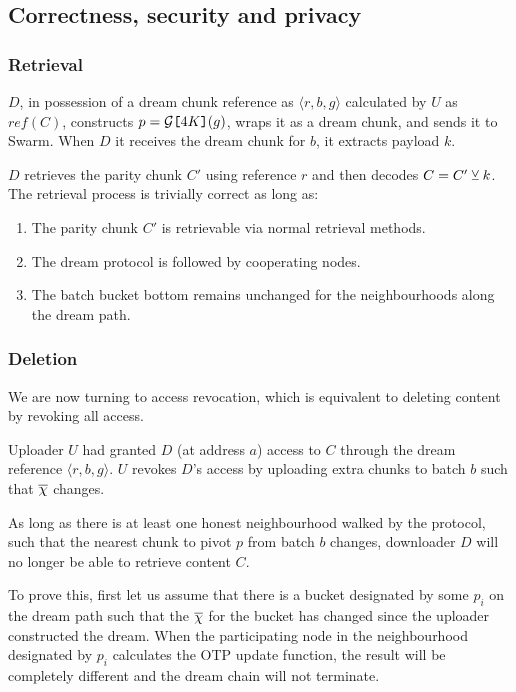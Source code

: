 \subsection{Correctness, security and privacy}

\subsubsection{Retrieval}
$D$, in possession of a dream chunk reference as 
$\langle r,b,g\rangle $ calculated by $U$  as $\mathit{ref}(C)$, constructs $p=\mathcal{G}\texttt{[}\/4K\/\texttt{]}(g)$, wraps it as a dream chunk, and sends it to Swarm. When $D$ it receives the dream chunk for $b$, it extracts payload $k$.

$D$ retrieves the parity chunk $C'$ using reference $r$ and then decodes $C=C'\veebar k$.
The retrieval process is trivially correct as long as: 
\begin{enumerate}
\item  The parity chunk $C'$ is retrievable via normal retrieval methods. 
\item The dream protocol is followed by cooperating nodes.
\item The batch bucket bottom remains unchanged for the neighbourhoods along the dream path. 
\end{enumerate}

\subsubsection{Deletion}
We are now turning to access revocation, which is equivalent to deleting content by revoking all access.


Uploader $U$ had granted $D$ (at address $a$) access to $C$ through the dream reference $\langle r,b,g\rangle $. $U$ revokes $D$'s access by uploading extra chunks to batch $b$ such that $\overline{\Huge\chi}$ changes.

As long as there is at least one honest neighbourhood walked by the protocol, such that the nearest chunk to pivot $p$ from batch $b$ changes, downloader $D$ will no longer be able to retrieve content $C$.

To prove this, first let us assume that there is a bucket designated by some $p_i$ on the dream path such that the $\overline{\Huge\chi}$ for the bucket has changed since the uploader constructed the dream. When the participating node in the neighbourhood designated by $p_i$ calculates the OTP update function, the result will be completely different and the dream chain will not terminate. 

